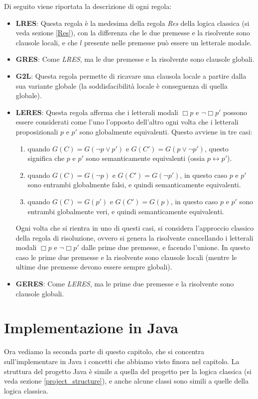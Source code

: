 \documentclass[a4paper,12pt]{report}
\newcommand{\tto} {\leftrightarrow}
\begin{document}
Di seguito viene riportata la descrizione di ogni regola:
\begin{itemize}
    \item \textbf{LRES}: Questa regola è la medesima della regola \emph{Res} della logica classica (si veda sezione \ref{Res}), con la differenza che le due premesse e la risolvente sono clausole locali, e che $l$ presente nelle premesse può essere un letterale modale.
    \item \textbf{GRES}: Come \emph{LRES}, ma le due premesse e la risolvente sono clausole globali.
    \item \textbf{G2L}: Questa regola permette di ricavare una clausola locale a partire dalla sua variante globale (la soddisfacibilità locale è conseguenza di quella globale).
    \item \textbf{LERES}: Questa regola afferma che i letterali modali $\Box p$ e $\lnot \Box p'$ possono essere considerati come l'uno l'opposto dell'altro ogni volta che i letterali proposizionali $p$ e $p'$ sono globalmente equivalenti. Questo avviene in tre casi: \begin{enumerate}
        \item quando $G(C) = G(\lnot p \lor p')$ e $G(C') = G(p \lor \lnot p')$, questo significa che $p$ e $p'$ sono semanticamente equivalenti (ossia $p \tto p'$).
        \item quando $G(C) = G(\lnot p)$ e $G(C') = G(\lnot p')$, in questo caso $p$ e $p'$ sono entrambi globalmente falsi, e quindi semanticamente equivalenti.
        \item quando $G(C) = G(p')$ e $G(C') = G(p)$, in questo caso $p$ e $p'$ sono entrambi globalmente veri, e quindi semanticamente equivalenti.
    \end{enumerate}
    Ogni volta che si rientra in uno di questi casi, si considera l'approccio classico della regola di risoluzione, ovvero si genera la risolvente cancellando i letterali modali $\Box p$ e $\lnot \Box p'$ dalle prime due premesse, e facendo l'unione. In questo caso le prime due premesse e la risolvente sono clausole locali (mentre le ultime due premesse devono essere sempre globali).
    \item \textbf{GERES}: Come \emph{LERES}, ma le prime due premesse e la risolvente sono clausole globali.
\end{itemize}

\section*{Implementazione in Java}
Ora vediamo la seconda parte di questo capitolo, che si concentra sull'implementare in Java i concetti che abbiamo visto finora nel capitolo. La struttura del progetto Java è simile a quella del progetto per la logica classica (si veda sezione \ref{project_structure}), e anche alcune classi sono simili a quelle della logica classica.
\end{document}
